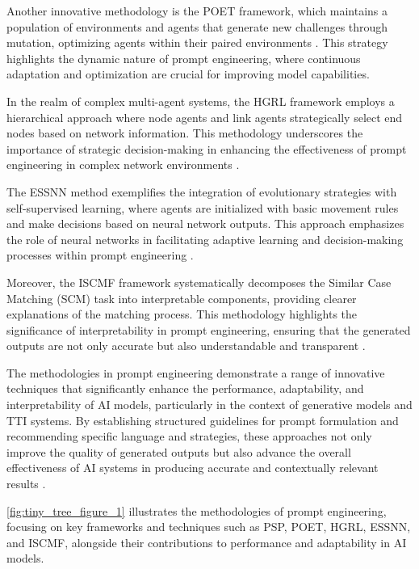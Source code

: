 Another innovative methodology is the POET framework, which maintains a population of environments and agents that generate new challenges through mutation, optimizing agents within their paired environments \cite{wang2019pairedopenendedtrailblazerpoet}. This strategy highlights the dynamic nature of prompt engineering, where continuous adaptation and optimization are crucial for improving model capabilities.

In the realm of complex multi-agent systems, the HGRL framework employs a hierarchical approach where node agents and link agents strategically select end nodes based on network information. This methodology underscores the importance of strategic decision-making in enhancing the effectiveness of prompt engineering in complex network environments \cite{chen2024adaptivenetworkinterventioncomplex}.

The ESSNN method exemplifies the integration of evolutionary strategies with self-supervised learning, where agents are initialized with basic movement rules and make decisions based on neural network outputs. This approach emphasizes the role of neural networks in facilitating adaptive learning and decision-making processes within prompt engineering \cite{le2019evolvingselfsupervisedneuralnetworks}.

Moreover, the ISCMF framework systematically decomposes the Similar Case Matching (SCM) task into interpretable components, providing clearer explanations of the matching process. This methodology highlights the significance of interpretability in prompt engineering, ensuring that the generated outputs are not only accurate but also understandable and transparent \cite{lin2023interpretabilityframeworksimilarcase}.

The methodologies in prompt engineering demonstrate a range of innovative techniques that significantly enhance the performance, adaptability, and interpretability of AI models, particularly in the context of generative models and TTI systems. By establishing structured guidelines for prompt formulation and recommending specific language and strategies, these approaches not only improve the quality of generated outputs but also advance the overall effectiveness of AI systems in producing accurate and contextually relevant results \cite{palmini2024patternscreativityuserinput}. 

\autoref{fig:tiny_tree_figure_1} illustrates the methodologies of prompt engineering, focusing on key frameworks and techniques such as PSP, POET, HGRL, ESSNN, and ISCMF, alongside their contributions to performance and adaptability in AI models.

